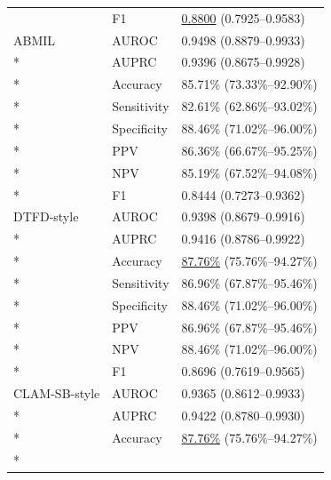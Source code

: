 \begin{longtable}{@{}p{}p{}p{}@{}}
 & F1 & \underline{0.8800} (0.7925--0.9583) \\

\addlinespace

ABMIL & AUROC & 0.9498 (0.8879--0.9933) \\*

 & AUPRC & 0.9396 (0.8675--0.9928) \\*

 & Accuracy & 85.71\% (73.33\%--92.90\%) \\*

 & Sensitivity & 82.61\% (62.86\%--93.02\%) \\*

 & Specificity & 88.46\% (71.02\%--96.00\%) \\*

 & PPV & 86.36\% (66.67\%--95.25\%) \\*

 & NPV & 85.19\% (67.52\%--94.08\%) \\*

 & F1 & 0.8444 (0.7273--0.9362) \\

\addlinespace

DTFD-style & AUROC & 0.9398 (0.8679--0.9916) \\*

 & AUPRC & 0.9416 (0.8786--0.9922) \\*

 & Accuracy & \underline{87.76\%} (75.76\%--94.27\%) \\*

 & Sensitivity & 86.96\% (67.87\%--95.46\%) \\*

 & Specificity & 88.46\% (71.02\%--96.00\%) \\*

 & PPV & 86.96\% (67.87\%--95.46\%) \\*

 & NPV & 88.46\% (71.02\%--96.00\%) \\*

 & F1 & 0.8696 (0.7619--0.9565) \\

\addlinespace

CLAM-SB-style & AUROC & 0.9365 (0.8612--0.9933) \\*

 & AUPRC & 0.9422 (0.8780--0.9930) \\*

 & Accuracy & \underline{87.76\%} (75.76\%--94.27\%) \\*


\end{longtable}
